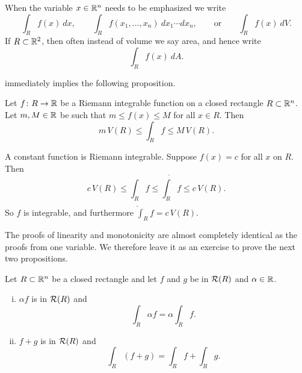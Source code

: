 When the variable $x \in {\mathbb{R}}^n$ needs to be emphasized we write
\begin{equation*}
\int_R f(x)~dx,
\qquad
\int_R f(x_1,\ldots,x_n)~dx_1 \cdots dx_n,
\qquad
\text{or}
\qquad
\int_R f(x)~dV .
\end{equation*}
If $R \subset {\mathbb{R}}^2$, then often instead of volume we say area, and hence
write
\begin{equation*}
\int_R f(x)~dA .
\end{equation*}

 immediately implies the following
proposition.

\begin{prop} \label{mv:intbound:prop}
Let $f \colon R \to {\mathbb{R}}$ be a Riemann integrable function
on a closed rectangle $R \subset {\mathbb{R}}^n$.
Let $m, M \in {\mathbb{R}}$ be 
such that $m \leq f(x) \leq M$ for all $x \in R$.  Then
\begin{equation*}
m \, V(R) \leq
\int_{R} f
\leq M \, V(R) .
\end{equation*}
\end{prop}

\begin{example}
A constant function is Riemann integrable.  Suppose
$f(x) = c$ for all $x$ on $R$.  Then
\begin{equation*}
c \, V(R) \leq \underline{\int_R} f \leq \overline{\int_R} f \leq c\, V(R) .
\end{equation*}
So $f$ is integrable, and furthermore $\int_R f = c\,V(R)$.
\end{example}

The proofs of linearity and monotonicity are almost completely identical as
the proofs from one variable.  We therefore leave it as an exercise to prove
the next two propositions.

\begin{samepage}
\begin{prop}[Linearity] \label{mv:intlinearity:prop}
Let $R \subset {\mathbb{R}}^n$ be a closed rectangle and let
$f$ and $g$ be in ${\mathcal{R}}(R)$ and $\alpha \in {\mathbb{R}}$.
\begin{enumerate}[(i)]
\item $\alpha f$ is in ${\mathcal{R}}(R)$ and
\begin{equation*}
\int_R \alpha f = \alpha \int_R f .
\end{equation*}
\item $f+g$ is in ${\mathcal{R}}(R)$ and
\begin{equation*}
\int_R (f+g) = 
\int_R f
+
\int_R g .
\end{equation*}
\end{enumerate}
\end{prop}
\end{samepage}

